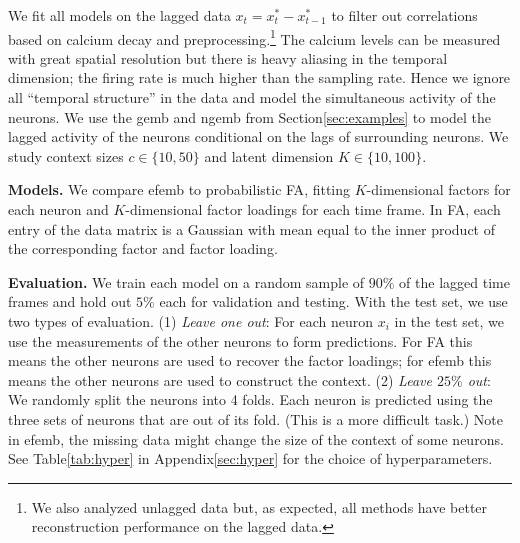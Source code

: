 \documentclass[12pt]{article}
\DeclareRobustCommand{\parhead}[1]{\vspace{0.05in} \textbf{#1} }
\begin{document}
We fit all models on the lagged data $x_{t} = x^*_t - x^*_{t-1}$ to
filter out correlations based on calcium decay and preprocessing.\footnote{We also analyzed unlagged data but, as expected, all methods
  have better reconstruction performance on the lagged data.}  The
calcium levels can be measured with great spatial resolution but there
is heavy aliasing in the temporal dimension; the firing rate is much 
higher than the sampling rate. Hence we ignore all ``temporal structure'' 
in the data and model the simultaneous activity of the neurons. We use 
the \gls{gemb} and \gls{ngemb} from Section\nobreakspace \ref {sec:examples} to model the 
lagged activity of the neurons conditional on the lags of surrounding 
neurons. We study context sizes $c \in \{10,50\}$ and latent dimension
$K \in \{10, 100\}$.

\parhead{Models.} We compare \gls{efemb} to probabilistic \gls{FA},
fitting $K$-dimensional factors for each neuron and $K$-dimensional
factor loadings for each time frame. In \gls{FA}, each entry of the
data matrix is a Gaussian with mean equal to the inner product of the
corresponding factor and factor loading.

\parhead{Evaluation.}  We train each model on a random sample of $90\%$ of the lagged
time frames and hold out $5\%$ each for validation and testing.  With the test
set, we use two types of evaluation.  (1) {\it Leave one out}: For
each neuron $x_{i}$ in the test set, we use the measurements of the
other neurons to form predictions. For \gls{FA} this means the other
neurons are used to recover the factor loadings; for \gls{efemb} this
means the other neurons are used to construct the context.  (2) {\it
  Leave $25 \%$ out}: We randomly split the neurons into 4 folds.
Each neuron is predicted using the three sets of neurons that are out
of its fold.  (This is a more difficult task.)  Note in \gls{efemb},
the missing data might change the size of the context of some neurons.
See Table\nobreakspace \ref {tab:hyper} in Appendix\nobreakspace \ref {sec:hyper} for the choice of
hyperparameters.
\end{document}
